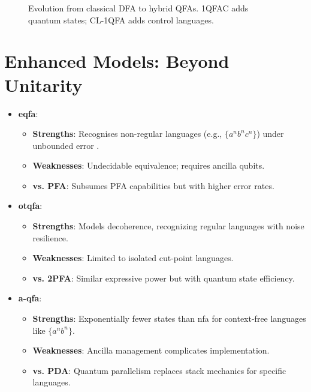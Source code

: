 \begin{figure}[ht]
\centering
{}
\caption{Evolution from classical DFA to hybrid QFAs. 1QFAC adds quantum states; CL-1QFA adds control languages.}
\label{fig:hybrid-evolution}
\end{figure}

\section{Enhanced Models: Beyond Unitarity}
\label{sec:enhanced-comparison}
\begin{itemize}
    \item \textbf{\gls{eqfa}}:
    \begin{itemize}
        \item \textbf{Strengths}: Recognises non-regular languages (e.g., \( \{a^n b^n c^n\} \)) under unbounded error \cite{paschen2000quantum}.
        \item \textbf{Weaknesses}: Undecidable equivalence; requires ancilla qubits.
        \item \textbf{vs. PFA}: Subsumes PFA capabilities but with higher error rates.
    \end{itemize}
    
    \item \textbf{\gls{otqfa}}:
    \begin{itemize}
        \item \textbf{Strengths}: Models decoherence, recognizing regular languages with noise resilience.
        \item \textbf{Weaknesses}: Limited to isolated cut-point languages.
        \item \textbf{vs. 2PFA}: Similar expressive power but with quantum state efficiency.
    \end{itemize}
    
    \item \textbf{\gls{a-qfa}}:
    \begin{itemize}
        \item \textbf{Strengths}: Exponentially fewer states than \gls{nfa} for context-free languages like \( \{a^n b^n\} \).
        \item \textbf{Weaknesses}: Ancilla management complicates implementation.
        \item \textbf{vs. PDA}: Quantum parallelism replaces stack mechanics for specific languages.
    \end{itemize}
\end{itemize}

